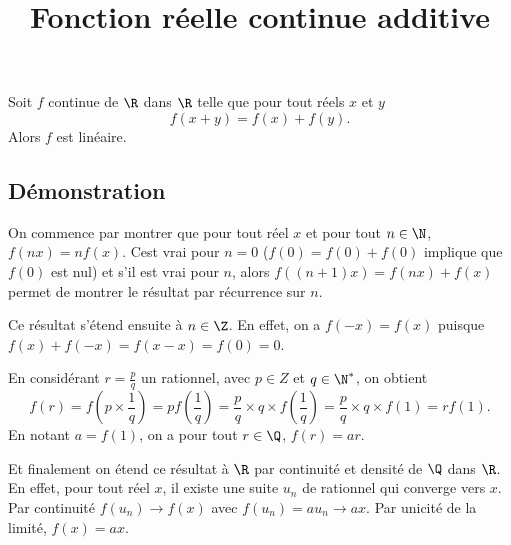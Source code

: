 \documentclass[fontsize=12pt,twoside=false,parskip=half]{scrartcl}
\title{Fonction réelle continue additive}
\date{}
\author{}
\begin{document}
\maketitle
   \begin{Theoreme}
      Soit $f$ continue de $\R$ dans $\R$ telle que pour tout réels $x$ et $y$
      \[
        f(x + y) = f(x) + f(y).
      \]
      Alors $f$ est linéaire.
   \end{Theoreme}
   \subsection{Démonstration}
        On commence par montrer que pour tout réel $x$ et pour tout $n \in \N$,
        $f(nx) = nf(x)$. Cest vrai pour $n = 0$ ($f(0) = f(0) + f(0)$
        implique que $f(0)$ est nul) et s'il est vrai pour $n$, alors
        $f((n + 1)x) = f(nx) + f(x)$ permet de montrer le résultat par récurrence
        sur $n$.

        Ce résultat s'étend ensuite à $ n \in \Z$. En effet, on a $f(-x) = f(x)$
        puisque $f(x) + f(-x) =f(x - x) = f(0) = 0$.

        En considérant $r = \frac{p}{q}$ un rationnel, avec $p \in Z$ et $q \in \N^*$,
        on obtient
        \[
            f(r) = f\left(p \times \frac{1}{q}\right) = p f\left(\frac{1}{q}\right)
                 = \frac{p}{q}\times q \times f\left(\frac{1}{q}\right)
                 = \frac{p}{q}\times q \times f(1)
                 = rf(1).
        \]
        En notant $a = f(1)$, on a pour tout $r \in \Q$, $f(r) = ar$.

        Et finalement on étend ce résultat à $\R$ par continuité et densité de $\Q$
        dans $\R$. En effet, pour tout réel $x$, il existe une suite $u_n$ de
        rationnel qui converge vers $x$. Par continuité $f(u_n) \to f(x)$ avec
        $f(u_n) = au_n \to ax$. Par unicité de la limité, $f(x) = ax$.    
\end{document}

